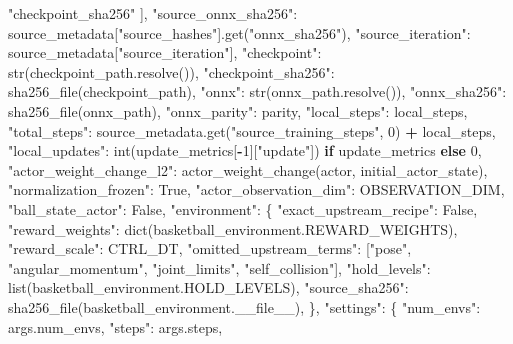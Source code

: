 \documentclass[
  american,
  11pt,
  letterpaper,
]{article}
\newenvironment{Shaded}{\begin{snugshade}}{\end{snugshade}}
\newcommand{\BuiltInTok}[1]{#1}
\newcommand{\ControlFlowTok}[1]{\textcolor[rgb]{0.13,0.29,0.53}{\textbf{#1}}}
\newcommand{\DecValTok}[1]{\textcolor[rgb]{0.00,0.00,0.81}{#1}}
\newcommand{\NormalTok}[1]{#1}
\newcommand{\OperatorTok}[1]{\textcolor[rgb]{0.81,0.36,0.00}{\textbf{#1}}}
\newcommand{\StringTok}[1]{\textcolor[rgb]{0.31,0.60,0.02}{#1}}
\newcommand{\VariableTok}[1]{\textcolor[rgb]{0.00,0.00,0.00}{#1}}
\renewenvironment{Shaded}{\par\smallskip}{\par\smallskip}
\begin{document}
\begin{Shaded}
\begin{Highlighting}[]
            \StringTok{"checkpoint\_sha256"}
\NormalTok{        ],}
        \StringTok{"source\_onnx\_sha256"}\NormalTok{: source\_metadata[}\StringTok{"source\_hashes"}\NormalTok{].get(}\StringTok{"onnx\_sha256"}\NormalTok{),}
        \StringTok{"source\_iteration"}\NormalTok{: source\_metadata[}\StringTok{"source\_iteration"}\NormalTok{],}
        \StringTok{"checkpoint"}\NormalTok{: }\BuiltInTok{str}\NormalTok{(checkpoint\_path.resolve()),}
        \StringTok{"checkpoint\_sha256"}\NormalTok{: sha256\_file(checkpoint\_path),}
        \StringTok{"onnx"}\NormalTok{: }\BuiltInTok{str}\NormalTok{(onnx\_path.resolve()),}
        \StringTok{"onnx\_sha256"}\NormalTok{: sha256\_file(onnx\_path),}
        \StringTok{"onnx\_parity"}\NormalTok{: parity,}
        \StringTok{"local\_steps"}\NormalTok{: local\_steps,}
        \StringTok{"total\_steps"}\NormalTok{: source\_metadata.get(}\StringTok{"source\_training\_steps"}\NormalTok{, }\DecValTok{0}\NormalTok{) }\OperatorTok{+}\NormalTok{ local\_steps,}
        \StringTok{"local\_updates"}\NormalTok{: }\BuiltInTok{int}\NormalTok{(update\_metrics[}\OperatorTok{{-}}\DecValTok{1}\NormalTok{][}\StringTok{"update"}\NormalTok{]) }\ControlFlowTok{if}\NormalTok{ update\_metrics }\ControlFlowTok{else} \DecValTok{0}\NormalTok{,}
        \StringTok{"actor\_weight\_change\_l2"}\NormalTok{: actor\_weight\_change(actor, initial\_actor\_state),}
        \StringTok{"normalization\_frozen"}\NormalTok{: }\VariableTok{True}\NormalTok{,}
        \StringTok{"actor\_observation\_dim"}\NormalTok{: OBSERVATION\_DIM,}
        \StringTok{"ball\_state\_actor"}\NormalTok{: }\VariableTok{False}\NormalTok{,}
        \StringTok{"environment"}\NormalTok{: \{}
            \StringTok{"exact\_upstream\_recipe"}\NormalTok{: }\VariableTok{False}\NormalTok{,}
            \StringTok{"reward\_weights"}\NormalTok{: }\BuiltInTok{dict}\NormalTok{(basketball\_environment.REWARD\_WEIGHTS),}
            \StringTok{"reward\_scale"}\NormalTok{: CTRL\_DT,}
            \StringTok{"omitted\_upstream\_terms"}\NormalTok{: [}\StringTok{"pose"}\NormalTok{, }\StringTok{"angular\_momentum"}\NormalTok{, }\StringTok{"joint\_limits"}\NormalTok{, }\StringTok{"self\_collision"}\NormalTok{],}
            \StringTok{"hold\_levels"}\NormalTok{: }\BuiltInTok{list}\NormalTok{(basketball\_environment.HOLD\_LEVELS),}
            \StringTok{"source\_sha256"}\NormalTok{: sha256\_file(basketball\_environment.}\VariableTok{\_\_file\_\_}\NormalTok{),}
\NormalTok{        \},}
        \StringTok{"settings"}\NormalTok{: \{}
            \StringTok{"num\_envs"}\NormalTok{: args.num\_envs,}
            \StringTok{"steps"}\NormalTok{: args.steps,}

\end{Highlighting}
\end{Shaded}
\end{document}
